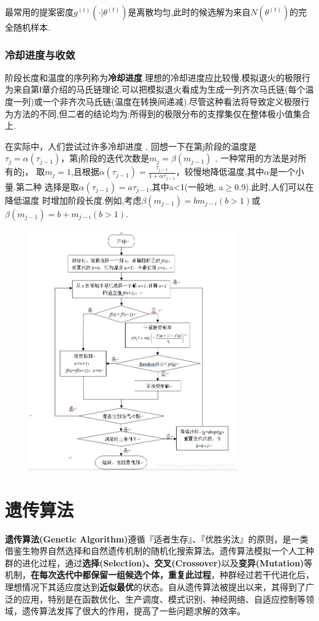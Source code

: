 \documentclass[11pt,a4paper,oneside]{book}
\begin{document}
最常用的提案密度$ g^{(t)}(\cdot|\theta^{(t)}) $是离散均匀,此时的候选解为来自$ N(\theta^{(t)}) $的完全随机样本.
\subsubsection{冷却进度与收敛}
阶段长度和温度的序列称为\textbf{冷却进度}.理想的冷却进度应比较慢.模拟退火的极限行为来自第Ⅰ章介绍的马氏链理论.可以把模拟退火看成为生成一列齐次马氏链(每个温度一列)或一个非齐次马氏链(温度在转换间递减).尽管这种看法将导致定义极限行为方法的不同,但二者的结论均为:所得到的极限分布的支撑集仅在整体极小值集合上.

在实际中，人们尝试过许多冷却进度﹒回想一下在第j阶段的温度是
$ \tau_j=\alpha (\tau_{j-1}) $，第j阶段的迭代次数是$ m_j=\beta (m_{j-1}) $﹒一种常用的方法是对所有的j，
取$ m_j =1 $,且根据$ \alpha (\tau_{j-1})=\frac{\tau_{j-1}}{1+\alpha\tau_{j-1}}$，较慢地降低温度,其中$ \alpha $是一个小量.第二种
选择是取$ \alpha (\tau_{j-1})=a\tau_{j-1} $,其中a<1(一般地, a$ \geq $0.9).此时,人们可以在降低温度
时增加阶段长度.例如,考虑$ \beta(m_{j-1})= bm_{j-i}(b >1) $或$ \beta(m_{j-1})= b+m_{j-i}(b >1) $.\\

\begin{figure}[H]
	\centering
	\includegraphics[width=0.8\textwidth]{23.png}
\end{figure}

\section{遗传算法}
\textbf{遗传算法(Genetic Algorithm)}遵循『适者生存』、『优胜劣汰』的原则，是一类借鉴生物界自然选择和自然遗传机制的随机化搜索算法。遗传算法模拟一个人工种群的进化过程，通过\textbf{选择(Selection)、交叉(Crossover)}以及\textbf{变异(Mutation)}等机制，\textbf{在每次迭代中都保留一组候选个体，重复此过程}，种群经过若干代进化后，理想情况下其适应度达到\textbf{近似最优}的状态。自从遗传算法被提出以来，其得到了广泛的应用，特别是在函数优化、生产调度、模式识别、神经网络、自适应控制等领域，遗传算法发挥了很大的作用，提高了一些问题求解的效率。
\end{document}
